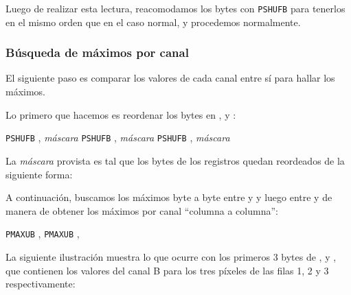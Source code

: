 Luego de realizar esta lectura, reacomodamos los bytes con \texttt{PSHUFB}
para tenerlos en el mismo orden que en el caso normal, y procedemos normalmente.



\subsubsection{Búsqueda de máximos por canal}

El siguiente paso es comparar los valores de cada canal entre sí para hallar los máximos.

Lo primero que hacemos es reordenar los bytes en ,  y :

\begin{algorithmic}
    \STATE \texttt{PSHUFB} , \textit{máscara}
    \STATE \texttt{PSHUFB} , \textit{máscara}
    \STATE \texttt{PSHUFB} , \textit{máscara}
\end{algorithmic}

La \textit{máscara} provista es tal que los bytes de los registros quedan
reordeados de la siguiente forma:

\begin{center}
\end{center}

A continuación, buscamos los máximos byte a byte entre  y  y luego entre
 y  de manera de obtener los máximos por canal ``columna a columna'':

\begin{algorithmic}
    \STATE \texttt{PMAXUB} , 
    \STATE \texttt{PMAXUB} ,     
\end{algorithmic}

La siguiente ilustración muestra lo que ocurre con los primeros 3 bytes de
,  y , que contienen los valores del canal B para los
tres píxeles de las filas 1, 2 y 3 respectivamente:

